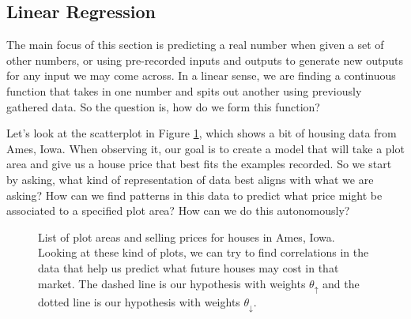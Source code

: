 \def\tu{\vec\theta_{\uparrow}}
\def\td{\vec\theta_{\downarrow}}

\subsection{Linear Regression}




The main focus of this section is predicting a real number when given a set of
other numbers, or using pre-recorded inputs and outputs to generate new outputs
for any input we may come across. In a linear sense, we are finding a continuous
function that takes in one number and spits out another using previously
gathered data. So the question is, how do we form this function?


Let's look at the scatterplot in Figure \ref{fig:hp}, which shows a bit of
housing data from Ames, Iowa. When observing it, our goal is to create a model
that will take a plot area and give us a house price that best fits the examples
recorded. So we start by asking, what kind of representation of data best aligns
with what we are asking? How can we find patterns in this data to predict what
price might be associated to a specified plot area? How can we do this
autonomously?

\begin{figure}[t!]
\centering
    \caption{List of plot areas and selling prices for houses in Ames, Iowa.
    Looking at these kind of plots, we can try to find correlations in the data
    that help us predict what future houses may cost in that market. The dashed line is our hypothesis with weights $\theta_{\uparrow}$ and the dotted line is our hypothesis with weights $\theta_{\downarrow}$.}
    \label{fig:hp}
\end{figure}


